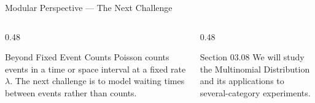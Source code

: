 \documentclass[aspectratio=169,xcolor={dvipsnames,table}]{beamer}
\begin{document}
\begin{frame}{Modular Perspective --- The Next Challenge}
	\begin{columns}[T]
		\begin{column}{0.48\textwidth}
			\begin{block}{Beyond Fixed Event Counts}
				\scriptsize
				Poisson counts events in a time or space interval at a fixed rate $\lambda$. The next challenge is to model waiting times between events rather than counts.
			\end{block}
		\end{column}
		\begin{column}{0.48\textwidth}
			\begin{alertblock}{Section 03.08}
				\scriptsize
				We will study the Multinomial Distribution and its applications to several-category experiments.
			\end{alertblock}
		\end{column}
	\end{columns}
\end{frame}
\end{document}
